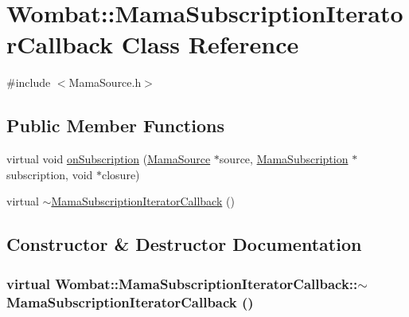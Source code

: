\hypertarget{classWombat_1_1MamaSubscriptionIteratorCallback}{
\section{Wombat::MamaSubscriptionIteratorCallback Class Reference}
\label{classWombat_1_1MamaSubscriptionIteratorCallback}
}


{\ttfamily \#include $<$MamaSource.h$>$}\subsection*{Public Member Functions}
\begin{DoxyCompactItemize}
\item 
virtual void \hyperlink{classWombat_1_1MamaSubscriptionIteratorCallback_a62864194bc7afdf0f5ff1ea892c0d01a}{onSubscription} (\hyperlink{classWombat_1_1MamaSource}{MamaSource} $\ast$source, \hyperlink{classWombat_1_1MamaSubscription}{MamaSubscription} $\ast$subscription, void $\ast$closure)
\item 
virtual \hyperlink{classWombat_1_1MamaSubscriptionIteratorCallback_a68e7b4643bc5239393cfc37e0f94a742}{$\sim$MamaSubscriptionIteratorCallback} ()
\end{DoxyCompactItemize}


\subsection{Constructor \& Destructor Documentation}
\hypertarget{classWombat_1_1MamaSubscriptionIteratorCallback_a68e7b4643bc5239393cfc37e0f94a742}{
\subsubsection[{$\sim$MamaSubscriptionIteratorCallback}]{\setlength{\rightskip}{0pt plus 5cm}virtual Wombat::MamaSubscriptionIteratorCallback::$\sim$MamaSubscriptionIteratorCallback ()}}
\label{classWombat_1_1MamaSubscriptionIteratorCallback_a68e7b4643bc5239393cfc37e0f94a742}


